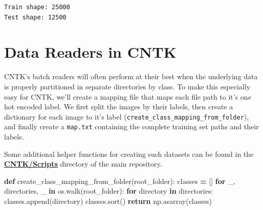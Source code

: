 \documentclass[]{book}
\newenvironment{Shaded}{\begin{snugshade}}{\end{snugshade}}
\newcommand{\KeywordTok}[1]{\textcolor[rgb]{0.13,0.29,0.53}{\textbf{#1}}}
\newcommand{\FunctionTok}[1]{\textcolor[rgb]{0.00,0.00,0.00}{#1}}
\newcommand{\ControlFlowTok}[1]{\textcolor[rgb]{0.13,0.29,0.53}{\textbf{#1}}}
\newcommand{\OperatorTok}[1]{\textcolor[rgb]{0.81,0.36,0.00}{\textbf{#1}}}
\newcommand{\ExtensionTok}[1]{#1}
\newcommand{\NormalTok}[1]{#1}
\theoremstyle{definition}
\theoremstyle{definition}
\theoremstyle{definition}
\theoremstyle{remark}
\begin{document}
\begin{verbatim}
Train shape: 25000
Test shape: 12500
\end{verbatim}

\section{Data Readers in CNTK}\label{data-readers-in-cntk}

CNTK's batch readers will often perform at their best when the
underlying data is properly partitioned in separate directories by
class. To make this especially easy for CNTK, we'll create a mapping
file that maps each file path to it's one hot encoded label. We first
split the images by their labels, then create a dictionary for each
image to it's label (\texttt{create\_class\_mapping\_from\_folder}), and
finally create a \texttt{map.txt} containing the complete training set
paths and their labels.

Some additional helper functions for creating such datasets can be found
in the
\href{https://github.com/Microsoft/CNTK/tree/master/Scripts}{\textbf{CNTK/Scripts}}
directory of the main repository.

\begin{Shaded}
\end{Shaded}

\begin{Shaded}
\begin{Highlighting}[]
\KeywordTok{def}\NormalTok{ create_class_mapping_from_folder(root_folder):}
\NormalTok{    classes }\OperatorTok{=}\NormalTok{ []}
    \ControlFlowTok{for}\NormalTok{ _, directories, _ }\KeywordTok{in}\NormalTok{ os.walk(root_folder):}
        \ControlFlowTok{for}\NormalTok{ directory }\KeywordTok{in}\NormalTok{ directories:}
\NormalTok{            classes.append(directory)}
\NormalTok{    classes.sort()}
    \ControlFlowTok{return}\NormalTok{ np.asarray(classes)}
\end{Highlighting}
\end{Shaded}
\end{document}
